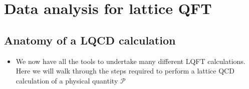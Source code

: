 \chapter{Data analysis for lattice QFT}
\label{ch:data-analysis}


\section{Anatomy of a LQCD calculation}
\begin{itemize}
\item We now have all the tools to undertake many different LQFT calculations. Here we will walk through the steps required to perform a lattice QCD calculation of a physical quantity $\mathcal{P}$
\end{itemize}
